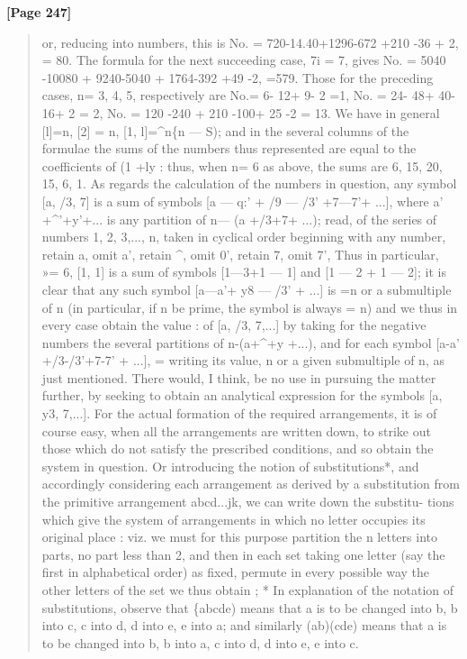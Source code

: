 \documentclass[11pt,a4paper]{book}
\begin{document}
\textbf{[Page 247]}\\[0.2cm]
\begin{quote}
or, reducing into numbers, this is
No. = 720-14.40+1296-672 +210 -36 + 2, = 80.
The formula for the next succeeding case, 7i = 7, gives
No. = 5040 -10080 + 9240-5040 + 1764-392 +49 -2, =579.
Those for the preceding cases, n= 3, 4, 5, respectively are
No.= 6- 12+ 9- 2 =1,
No. = 24- 48+ 40- 16+ 2 = 2,
No. = 120 -240 + 210 -100+ 25 -2 = 13.
We have in general [l]=n, [2] = n, [1, l]=\textasciicircum{}n\{n --- S); and in the several columns
of the formulae the sums of the numbers thus represented are equal to the coefficients
of (1 +ly : thus, when n= 6 as above, the sums are 6, 15, 20, 15, 6, 1. As regards
the calculation of the numbers in question, any symbol [a, /3, 7] is a sum of symbols
[a --- q:' + /9 --- /3' +7---7'+ ...], where a' +\textasciicircum{}'+y'+... is any partition of n--- (a +/3+7+ ...);
read, of the series of numbers 1, 2, 3,..., n, taken in cyclical order beginning with any
number, retain a, omit a', retain \textasciicircum{}, omit 0', retain 7, omit 7', Thus in particular,
»= 6, [1, 1] is a sum of symbols [1---3+1 --- 1] and [1 --- 2 + 1 --- 2]; it is clear that
any such symbol [a---a'+ y8 --- /3' + ...] is =n or a submultiple of n (in particular, if n
be prime, the symbol is always = n) and we thus in every case obtain the value
:
of [a, /3, 7,...] by taking for the negative numbers the several partitions of
n-(a+\textasciicircum{}+y
+...),
and for each symbol
[a-a' +/3-/3'+7-7' +
...],
=
writing its value, n or a given submultiple of n, as just mentioned. There would,
I think, be no use in pursuing the matter further, by seeking to obtain an analytical
expression for the symbols [a, y3, 7,...].
For the actual formation of the required arrangements, it is of course easy, when
all the arrangements are written down, to strike out those which do not satisfy the
prescribed conditions, and so obtain the system in question. Or introducing the notion
of substitutions*, and accordingly considering each arrangement as derived by a
substitution from the primitive arrangement abcd...jk, we can write down the substitu-
tions which give the system of arrangements in which no letter occupies its original
place : viz. we must for this purpose partition the n letters into parts, no part less
than 2, and then in each set taking one letter (say the first in alphabetical order)
as fixed, permute in every possible way the other letters of the set we thus obtain
;
* In explanation of the notation of substitutions, observe that \{abcde) means that a is to be changed
into b, b into c, c into d, d into e, e into a; and similarly (ab)(cde) means that a is to be changed into b,
b into a, c into d, d into e, e into c.
\end{quote}
\end{document}

